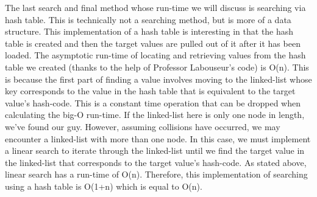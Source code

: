\documentclass[letterpaper, 10pt]{article}
\begin{document}
The last search and final method whose run-time we will discuss is searching via hash table. This is technically not a searching method, but is more of a data structure. This implementation of a hash table is interesting in that the hash table is created and then the target values are pulled out of it after it has been loaded. The asymptotic run-time of locating and retrieving values from the hash table we created (thanks to the help of Professor Labouseur's code) is O(n). This is because the first part of finding a value involves moving to the linked-list whose key corresponds to the value in the hash table that is equivalent to the target value's hash-code. This is a constant time operation that can be dropped when calculating the big-O run-time. If the linked-list here is only one node in length, we've found our guy. However, assuming collisions have occurred, we may encounter a linked-list with more than one node. In this case, we must implement a linear search to iterate through the linked-list until we find the target value in the linked-list that corresponds to the target value's hash-code. As stated above, linear search has a run-time of O(n). Therefore, this implementation of searching using a hash table is O(1+n) which is equal to O(n).\par
\end{document}
